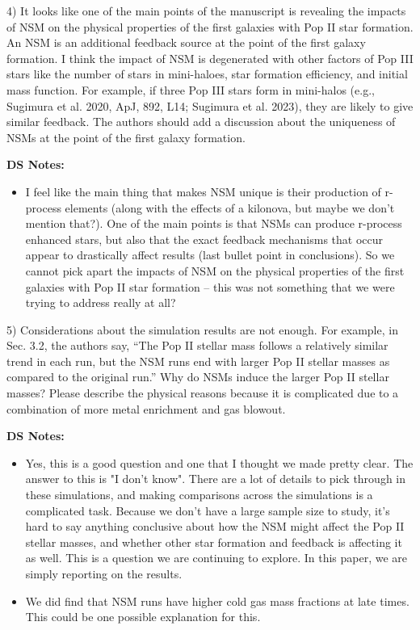 \documentclass[11pt]{article}
\begin{document}
\begin{tcolorbox}[colback={lightgray}]
    4)      It looks like one of the main points of the manuscript is revealing the impacts of NSM on the physical properties of the first galaxies with Pop II star formation. An NSM is an additional feedback source at the point of the first galaxy formation. I think the impact of NSM is degenerated with other factors of Pop III stars like the number of stars in mini-haloes, star formation efficiency, and initial mass function. For example, if three Pop III stars form in mini-halos (e.g., Sugimura et al. 2020, ApJ, 892, L14; Sugimura et al. 2023), they are likely to give similar feedback. The authors should add a discussion about the uniqueness of NSMs at the point of the first galaxy formation.
\end{tcolorbox}

\textbf{DS Notes:}
\begin{itemize}
    \item I feel like the main thing that makes NSM unique is their production of r-process elements (along with the effects of a kilonova, but maybe we don't mention that?). One of the main points is that NSMs can produce r-process enhanced stars, but also that the exact feedback mechanisms that occur appear to drastically affect results (last bullet point in conclusions). So we cannot pick apart the impacts of NSM on the physical properties of the first galaxies with Pop II star formation -- this was not something that we were trying to address really at all?
\end{itemize}

\begin{tcolorbox}[colback={lightgray}] 
    5)      Considerations about the simulation results are not enough. For example, in Sec. 3.2, the authors say, “The Pop II stellar mass follows a relatively similar trend in each run, but the NSM runs end with larger Pop II stellar masses as compared to the original run.” Why do NSMs induce the larger Pop II stellar masses? Please describe the physical reasons because it is complicated due to a combination of more metal enrichment and gas blowout.
\end{tcolorbox}

\textbf{DS Notes:}
\begin{itemize}
    \item Yes, this is a good question and one that I thought we made pretty clear. The answer to this is "I don't know". There are a lot of details to pick through in these simulations, and making comparisons across the simulations is a complicated task. Because we don't have a large sample size to study, it's hard to say anything conclusive about how the NSM might affect the Pop II stellar masses, and whether other star formation and feedback is affecting it as well. This is a question we are continuing to explore. In this paper, we are simply reporting on the results.
    \item We did find that NSM runs have higher cold gas mass fractions at late times. This could be one possible explanation for this.
\end{itemize}
\end{document}
